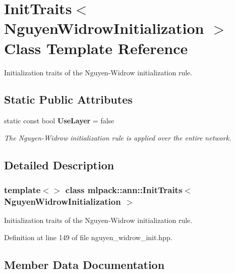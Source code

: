 \section{Init\+Traits$<$ Nguyen\+Widrow\+Initialization $>$ Class Template Reference}
\label{classmlpack_1_1ann_1_1InitTraits_3_01NguyenWidrowInitialization_01_4}


Initialization traits of the Nguyen-\/\+Widrow initialization rule.  


\subsection*{Static Public Attributes}
\begin{DoxyCompactItemize}
\item 
static const bool \textbf{ Use\+Layer} = false
\begin{DoxyCompactList}\small\item\em The Nguyen-\/\+Widrow initialization rule is applied over the entire network. \end{DoxyCompactList}\end{DoxyCompactItemize}


\subsection{Detailed Description}
\subsubsection*{template$<$$>$\newline
class mlpack\+::ann\+::\+Init\+Traits$<$ Nguyen\+Widrow\+Initialization $>$}

Initialization traits of the Nguyen-\/\+Widrow initialization rule. 

Definition at line 149 of file nguyen\+\_\+widrow\+\_\+init.\+hpp.



\subsection{Member Data Documentation}
\mbox{\label{classmlpack_1_1ann_1_1InitTraits_3_01NguyenWidrowInitialization_01_4_a6aadf10c95af2a5f0ab17196f682ffd4}} 
